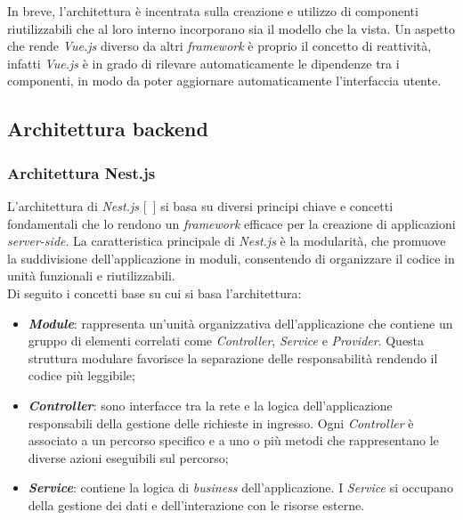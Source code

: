 In breve, l'architettura è incentrata sulla creazione e utilizzo di componenti riutilizzabili che al loro interno incorporano sia il modello che la vista. Un aspetto che rende \textit{Vue.js}
diverso da altri \textit{framework} è proprio il concetto di reattività, infatti \textit{Vue.js} è in grado di rilevare automaticamente le dipendenze tra i componenti, in modo da poter aggiornare automaticamente l'interfaccia utente.

\subsection{Architettura backend}\label{subsec:architettura-backend}
\subsubsection{Architettura Nest.js}\label{subsubsec:architettura-nest-js}
L'architettura di \textit{Nest.js} [~\cite{site:nest-architettura}] si basa su diversi principi chiave e concetti fondamentali che lo rendono un \textit{framework} efficace per la creazione di applicazioni \textit{server-side}.
La caratteristica principale di \textit{Nest.js} è la modularità, che promuove la suddivisione dell'applicazione in moduli, consentendo di organizzare il codice in unità funzionali e riutilizzabili.\\
Di seguito i concetti base su cui si basa l'architettura:
\begin{itemize}
  \item \textbf{\textit{Module}}: rappresenta un'unità organizzativa dell'applicazione che contiene un gruppo di elementi correlati come \textit{Controller}, \textit{Service} e \textit{Provider}. Questa struttura modulare 
  favorisce la separazione delle responsabilità rendendo il codice più leggibile;
  \item \textbf{\textit{Controller}}: sono interfacce tra la rete e la logica dell'applicazione responsabili della gestione delle richieste  in ingresso. Ogni \textit{Controller} è associato a un percorso specifico e a uno o più metodi che rappresentano le diverse azioni eseguibili sul percorso;
  \item \textbf{\textit{Service}}: contiene la logica di \textit{business} dell'applicazione. I \textit{Service} si occupano della gestione dei dati e dell'interazione con le risorse esterne.
\end{itemize}